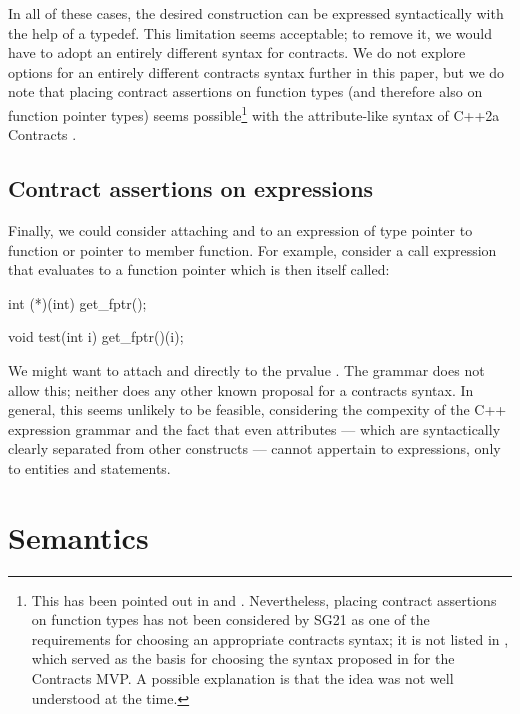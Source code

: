 In all of these cases, the desired construction can be expressed syntactically with the help of a typedef. This limitation seems acceptable; to remove it, we would have to adopt an entirely different syntax for contracts. We do not explore options for an entirely different contracts syntax further in this paper, but we do note that placing contract assertions on function types (and therefore also on function pointer types) seems possible\footnote{This has been pointed out in \cite{P2935R4} and \cite{P3028R0}. Nevertheless,  placing contract assertions on function types has not been considered by SG21 as one of the requirements for choosing an appropriate contracts syntax; it is not listed in \cite{P2885R3}, which served as the basis for choosing the syntax proposed in \cite{P2961R2} for the Contracts MVP. A possible explanation is that the idea was not well understood at the time.} with the attribute-like syntax of C++2a Contracts \cite{P0542R5}. 

\subsection{Contract assertions on expressions}
\label{syntax_expr}

Finally, we could consider attaching  and  to an expression of type pointer to function or pointer to member function. For example, consider a call expression that evaluates to a function pointer which is then itself called:

\begin{codeblock}
int (*)(int) get_fptr();

void test(int i) {
  get_fptr()(i);
}
\end{codeblock}
We might want to attach  and  directly to the prvalue . The \cite{P2900R8} grammar does not allow this; neither does any other known proposal for a contracts syntax. In general, this seems unlikely to be feasible, considering the compexity of the C++ expression grammar and the fact that even attributes --- which are syntactically clearly separated from other constructs --- cannot appertain to expressions, only to entities and statements.


\section{Semantics}
\label{semantics}

